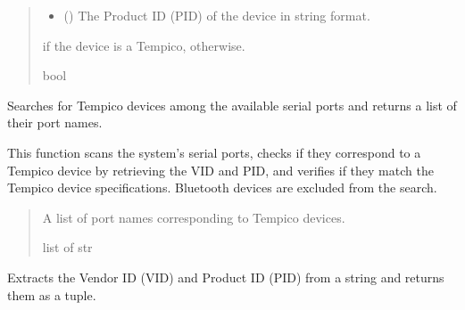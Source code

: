 \documentclass[letterpaper,10pt,english]{sphinxmanual}
\begin{document}
\begin{fulllineitems}
\begin{fulllineitems}
\begin{quote}
\begin{description}
\begin{itemize}
\item {} 
\sphinxAtStartPar
{} () \textendash{} The Product ID (PID) of the device in string format.

\end{itemize}

\sphinxAtStartPar
{} if the device is a Tempico,  otherwise.

\sphinxAtStartPar
bool

\end{description}\end{quote}

\end{fulllineitems}


\begin{fulllineitems}
\label{\detokenize{findDevices:findDevices.PyTempicoManager.get_pytempico_devices}}
\pysigstartsignatures
{}
\pysigstopsignatures
\sphinxAtStartPar
Searches for Tempico devices among the available serial ports and returns a list of their port names.

\sphinxAtStartPar
This function scans the system’s serial ports, checks if they correspond to a Tempico device by
retrieving the VID and PID, and verifies if they match the Tempico device specifications.
Bluetooth devices are excluded from the search.
\begin{quote}\begin{description}
\sphinxAtStartPar
A list of port names corresponding to Tempico devices.

\sphinxAtStartPar
list of str

\end{description}\end{quote}

\end{fulllineitems}


\begin{fulllineitems}
\label{\detokenize{findDevices:findDevices.PyTempicoManager.get_vid_pid}}
\pysigstartsignatures
{}
\pysigstopsignatures
\sphinxAtStartPar
Extracts the Vendor ID (VID) and Product ID (PID) from a string and returns them as a tuple.


\end{fulllineitems}
\end{fulllineitems}
\end{document}
